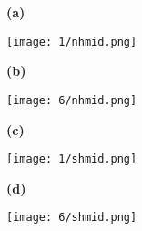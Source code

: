 \documentclass[preview]{standalone}
\begin{document}
\begin{figure}
  \begin{subfigure}[t]{0.05\textwidth}
    \textbf{\large{(a)}}
  \end{subfigure}
  \begin{subfigure}[t]{0.45\textwidth}
    \texttt{[image: 1/nhmid.png]}
  \end{subfigure}
  \begin{subfigure}[t]{0.05\textwidth}
    \textbf{\large{(b)}}
  \end{subfigure}
  \begin{subfigure}[t]{0.45\textwidth}
    \texttt{[image: 6/nhmid.png]}
  \end{subfigure}

  \begin{subfigure}[t]{0.05\textwidth}
    \textbf{\large{(c)}}
  \end{subfigure}
  \begin{subfigure}[t]{0.45\textwidth}
    \texttt{[image: 1/shmid.png]}
  \end{subfigure}
  \begin{subfigure}[t]{0.05\textwidth}
    \textbf{\large{(d)}}
  \end{subfigure}
  \begin{subfigure}[t]{0.45\textwidth}
    \texttt{[image: 6/shmid.png]}
  \end{subfigure}
\end{figure}
\end{document}
